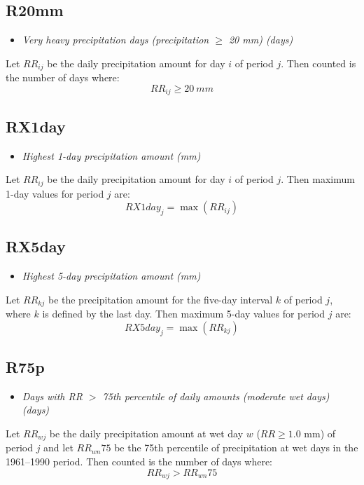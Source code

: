 \documentclass[a4paper,11pt]{article}
\begin{document}
\subsection*{R20mm}
\begin{itemize}
\item \textit{Very heavy precipitation days (precipitation $\geq$ 20
mm) (days)}
\end{itemize}
Let $RR_{ij}$ be the daily precipitation amount for day $i$ of period
$j$. Then counted is the number of days where:
\begin{equation*}
RR_{ij} \geq 20~mm
\end{equation*}

\subsection*{RX1day}
\begin{itemize}
\item \textit{Highest 1-day precipitation amount (mm)}
\end{itemize}
Let $RR_{ij}$ be the daily precipitation amount for day $i$ of period
$j$. Then maximum 1-day values for period $j$ are:
\begin{equation*}
RX1day_{j} = \max{(RR_{ij})}
\end{equation*}

\subsection*{RX5day}
\begin{itemize}
\item \textit{Highest 5-day precipitation amount (mm)}
\end{itemize}
Let $RR_{kj}$ be the precipitation amount for the five-day interval
$k$ of period $j$, where $k$ is defined by the last day. Then maximum
5-day values for period $j$ are:
\begin{equation*}
RX5day_{j} = \max{(RR_{kj})}
\end{equation*}

\subsection*{R75p}
\begin{itemize}
\item \textit{Days with RR $>$ 75th percentile of daily amounts
(moderate wet days) (days)}
\end{itemize}
Let $RR_{wj}$ be the daily precipitation amount at wet day $w$
($RR\geq1.0$ mm) of period $j$ and let $RR_{wn}75$ be the 75th
percentile of precipitation at wet days in the 1961--1990 period. Then
counted is the number of days where:
\begin{equation*}
RR_{wj} > RR_{wn}75
\end{equation*}
\end{document}
